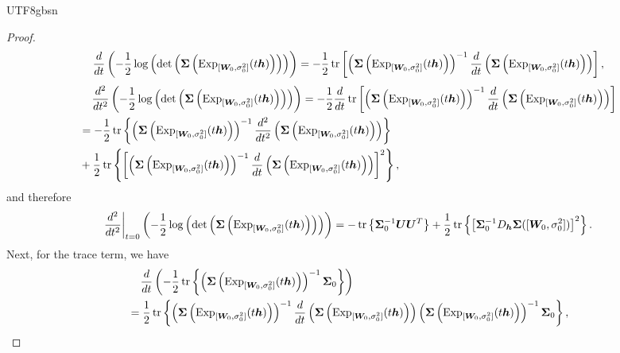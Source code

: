 \documentclass[12pt]{report}
\newcommand\tab[1][1cm]{\hspace*{#1}}
\newcommand{\bracket}[1]{\left ( #1 \right )}
\newcommand{\curly}[1]{\left \{ #1 \right \} }
\newcommand{\squared}[1]{\left [ #1 \right ]}
\theoremstyle{plain}
\theoremstyle{definition}
\begin{document}
\begin{CJK*}{UTF8}{gbsn}
\begin{proof}
\begin{equation*}
  \frac{d}{dt} \bracket{- \frac{1}{2} \log\bracket{\det \bracket{\bm{\Sigma}\bracket{\text{Exp}_{[\bm{W}_0, \sigma_0^2]}(t\bm{h})}}}}
  = - \frac{1}{2} \tr \squared{\bracket{\bm{\Sigma}\bracket{\text{Exp}_{[\bm{W}_0, \sigma_0^2]}(t\bm{h})}}^{-1}
  \frac{d}{dt} \bracket{\bm{\Sigma}\bracket{\text{Exp}_{[\bm{W}_0, \sigma_0^2]}(t\bm{h})}}},
\end{equation*}
\begin{equation*}
  \begin{split}
  & \tab[0.4cm]\frac{d^2}{dt^2} \bracket{- \frac{1}{2} \log\bracket{\det \bracket{\bm{\Sigma}\bracket{\text{Exp}_{[\bm{W}_0, \sigma_0^2]}(t\bm{h})}}}}
  = - \frac{1}{2}  \frac{d}{dt} \tr \squared{\bracket{\bm{\Sigma}\bracket{\text{Exp}_{[\bm{W}_0, \sigma_0^2]}(t\bm{h})}}^{-1}
  \frac{d}{dt} \bracket{\bm{\Sigma}\bracket{\text{Exp}_{[\bm{W}_0, \sigma_0^2]}(t\bm{h})}}}
  \\ & = - \frac{1}{2} \tr \curly{\bracket{\bm{\Sigma}\bracket{\text{Exp}_{[\bm{W}_0, \sigma_0^2]}(t\bm{h})}}^{-1}
  \frac{d^2}{dt^2} \bracket{\bm{\Sigma}\bracket{\text{Exp}_{[\bm{W}_0, \sigma_0^2]}(t\bm{h})}}}
  \\ & + \frac{1}{2} \tr \curly{\squared{\bracket{\bm{\Sigma}\bracket{\text{Exp}_{[\bm{W}_0, \sigma_0^2]}(t\bm{h})}}^{-1}
  \frac{d}{dt} \bracket{\bm{\Sigma}\bracket{\text{Exp}_{[\bm{W}_0, \sigma_0^2]}(t\bm{h})}}}^2 },
  \end{split}
\end{equation*}
and therefore 
\begin{equation*}
\frac{d^2}{dt^2}\bigg|_{t=0} 
  \bracket{- \frac{1}{2} \log\bracket{\det \bracket{\bm{\Sigma}\bracket{\text{Exp}_{[\bm{W}_0, \sigma_0^2]}(t\bm{h})}}}}
  = -  \tr \curly{\bm{\Sigma}_0^{-1}\bm{U}\bm{U}^T}
  + \frac{1}{2} \tr \curly{ \squared{\bm{\Sigma}_0^{-1}
  D_{\bm{h}} \bm{\Sigma}([\bm{W}_0, \sigma_0^2])}^2}.
\end{equation*}
Next, for the trace term, we have
\begin{equation*}
  \begin{split}
  & \tab[0.4cm] \frac{d}{dt} \bracket{- \frac{1}{2} \tr\curly{
  \bracket{\bm{\Sigma}\bracket{\text{Exp}_{[\bm{W}_0, \sigma_0^2]}(t\bm{h})}}^{-1} \bm{\Sigma}_0}}
  \\ & = \frac{1}{2} \tr \curly{\bracket{\bm{\Sigma}\bracket{\text{Exp}_{[\bm{W}_0, \sigma_0^2]}(t\bm{h})}}^{-1}
  \frac{d}{dt} \bracket{\bm{\Sigma}\bracket{\text{Exp}_{[\bm{W}_0, \sigma_0^2]}(t\bm{h})}}
  \bracket{\bm{\Sigma}\bracket{\text{Exp}_{[\bm{W}_0, \sigma_0^2]}(t\bm{h})}}^{-1}\bm{\Sigma}_0},

\end{split}
\end{equation*}
\end{proof}
\end{CJK*}
\end{document}

